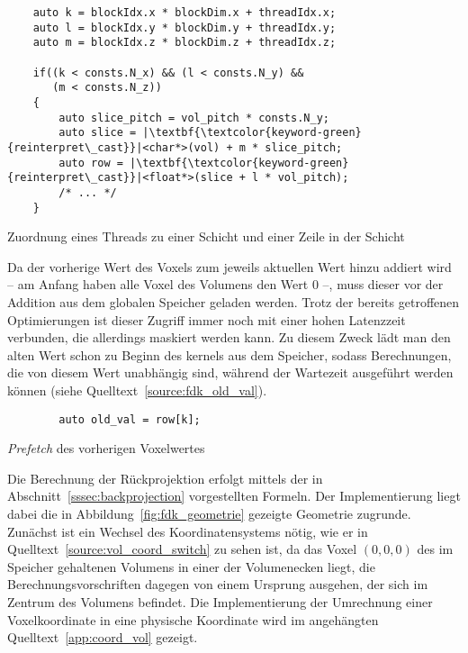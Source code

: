 \begin{listing}
\begin{verbatim}
    auto k = blockIdx.x * blockDim.x + threadIdx.x;
    auto l = blockIdx.y * blockDim.y + threadIdx.y;
    auto m = blockIdx.z * blockDim.z + threadIdx.z;

    if((k < consts.N_x) && (l < consts.N_y) &&
       (m < consts.N_z))
    {
        auto slice_pitch = vol_pitch * consts.N_y;
        auto slice = |\textbf{\textcolor{keyword-green}{reinterpret\_cast}}|<char*>(vol) + m * slice_pitch;
        auto row = |\textbf{\textcolor{keyword-green}{reinterpret\_cast}}|<float*>(slice + l * vol_pitch);
        /* ... */
    }    
\end{verbatim}
\caption{Zuordnung eines Threads zu einer Schicht und einer Zeile in der Schicht}
\label{source:vol_slice_row}
\end{listing}

Da der vorherige Wert des Voxels zum jeweils aktuellen Wert hinzu addiert wird -- am Anfang haben alle Voxel des
Volumens den Wert 0 --, muss dieser vor der Addition aus dem globalen Speicher geladen werden. Trotz der bereits
getroffenen Optimierungen ist dieser Zugriff immer noch mit einer hohen Latenzzeit verbunden, die allerdings maskiert
werden kann. Zu diesem Zweck lädt man den alten Wert schon zu Beginn des \gls{kernel}s aus dem Speicher, sodass
Berechnungen, die von diesem Wert unabhängig sind, während der Wartezeit ausgeführt werden können (siehe
Quelltext~\ref{source:fdk_old_val}).

\begin{listing}
\begin{verbatim}
        auto old_val = row[k];
\end{verbatim}
\caption{\textit{Prefetch} des vorherigen Voxelwertes}
\label{source:fdk_old_val}
\end{listing}

Die Berechnung der Rückprojektion erfolgt mittels der in Abschnitt~\ref{sssec:backprojection} vorgestellten Formeln. Der
Implementierung liegt dabei die in Abbildung~\ref{fig:fdk_geometrie} gezeigte Geometrie zugrunde. Zunächst ist ein
Wechsel des Koordinatensystems nötig, wie er in Quelltext~\ref{source:vol_coord_switch} zu sehen ist, da das Voxel
$(0, 0, 0)$ des im Speicher gehaltenen Volumens in einer der Volumenecken liegt, die Berechnungsvorschriften dagegen von
einem Ursprung ausgehen, der sich im Zentrum des Volumens befindet. Die Implementierung der Umrechnung einer
Voxelkoordinate in eine physische Koordinate wird im angehängten Quelltext~\ref{app:coord_vol} gezeigt.

